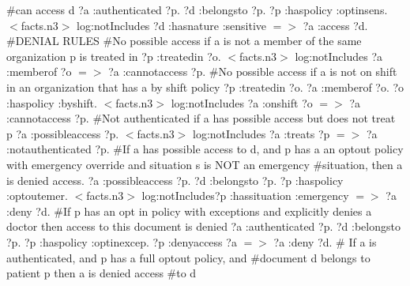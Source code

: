 \documentclass[conference]{IEEEtran}
\begin{document}
\#can access d \newline
\newline
{?a :authenticated ?p. ?d :belongsto ?p. ?p :haspolicy :optinsens. $<$facts.n3$>$ log:notIncludes {?d :hasnature :sensitive}}  $=>$ {?a :access ?d}. \newline
\newline
\#DENIAL RULES
\newline
\#No possible access if a is not a member of the same organization p is treated in \newline
\newline
{?p :treatedin ?o. $<$facts.n3$>$ log:notIncludes {?a :memberof ?o}}  $=>$ {?a :cannotaccess ?p}.
\newline
\#No possible access if a is not on shift in an organization that has a by shift policy \newline
\newline
{?p :treatedin ?o. ?a :memberof ?o. ?o :haspolicy :byshift. $<$facts.n3$>$ log:notIncludes {?a :onshift ?o}}  $=>$ {?a :cannotaccess ?p}.
\newline
\#Not authenticated if a has possible access but does not treat p \newline
\newline
{?a :possibleaccess ?p. $<$facts.n3$>$ log:notIncludes {?a :treats ?p}}  $=>$ {?a :notauthenticated ?p}.
\newline
\#If a has possible access to d, and p has a an optout policy with emergency override and situation s is NOT an emergency \newline
\#situation, then a is denied access.\newline
\newline
{?a :possibleaccess ?p. ?d :belongsto ?p. ?p :haspolicy :optoutemer. $<$facts.n3$>$ log:notIncludes{?p :hassituation :emergency}}  $=>$ {?a :deny ?d}. \newline
\newline
\#If p has an opt in policy with exceptions and explicitly denies a doctor then access to this document is denied \newline
\newline
{?a :authenticated ?p. ?d :belongsto ?p. ?p :haspolicy :optinexcep. ?p :denyaccess ?a}  $=>$ {?a :deny ?d}. \newline
\newline
\# If a is authenticated, and p has a full optout policy, and \#document d belongs to patient p then a is denied access \newline
\#to d  \newline
\end{document}
